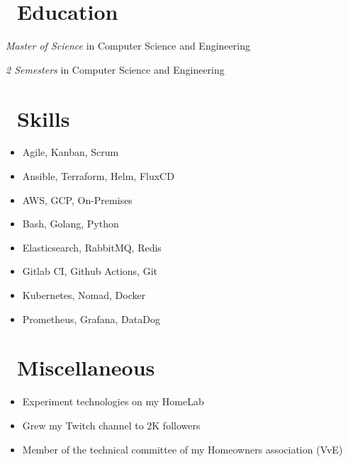 \documentclass{resume}
\begin{document}
\begin{minipage}[t]{0.30\textwidth}
\section{\texorpdfstring{\textbf{}\ Education}{Education}}

\textit{Master of Science} in Computer Science and Engineering

\textit{2 Semesters} in Computer Science and Engineering

\section{\texorpdfstring{\textbf{}\ Skills}{Skills}}

\begin{itemize}[parsep=0.5ex]
  \item Agile, Kanban, Scrum
  \item Ansible, Terraform, Helm, FluxCD
  \item AWS, GCP, On-Premises
  \item Bash, Golang, Python
  \item Elasticsearch, RabbitMQ, Redis
  \item Gitlab CI, Github Actions, Git
  \item Kubernetes, Nomad, Docker
  \item Prometheus, Grafana, DataDog
\end{itemize}

\section{\texorpdfstring{\textbf{}\ Miscellaneous}{Miscellaneous}}
\begin{itemize}[parsep=0.5ex]
  \item Experiment technologies on my HomeLab
  \item Grew my Twitch channel to 2K followers
  \item Member of the technical committee of my Homeowners association (VvE)
\end{itemize}
  
\end{minipage}
\hfill
\end{document}
